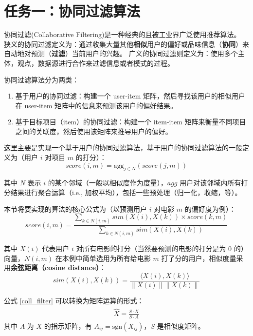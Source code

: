 \documentclass[degree=project,degree-type=project]{thuthesis}
\begin{document}
\chapter{任务一：协同过滤算法}

协同过滤(Collaborative Filtering)是一种经典的且被工业界广泛使用推荐算法。
狭义的协同过滤定义为：通过收集大量其他\textbf{相似}用户的偏好或品味信息（\textbf{协同}）来自动地对预测（\textbf{过滤}）当前用户的兴趣。
广义的协同过滤则定义为：使用多个主体，观点，数据源进行合作来过滤信息或者模式的过程。

协同过滤算法分为两类：

\begin{enumerate}
  \item 基于用户的协同过滤：构建一个 user-item 矩阵，然后寻找该用户的相似用户在 user-item 矩阵中的信息来预测该用户的偏好结果。
  \item 基于目标项目（item）的协同过滤：构建一个 item-item 矩阵来衡量不同项目之间的关联度，然后使用该矩阵来推导用户的偏好。
\end{enumerate}

这里主要是实现一个基于用户的协同过滤算法，基于用户的协同过滤算法的一般定义为（用户 $i$ 对项目 $m$ 的打分）：
\begin{equation}
  score(i, m) = \text{agg}_{j \in N}(score(j, m))
\end{equation}

其中 $N$ 表示 $i$ 的某个邻域（一般以相似度作为度量），$agg$ 用户对该邻域内所有打分结果进行聚合运算（i.e., 加权平均），包括一些预处理（归一化，收缩，等）。

本节将要实现的算法的核心公式为（以预测用户 $i$ 对电影 $m$ 的偏好度为例）：
\begin{equation}
score(i, m) = \frac{\sum_{k \in N(i, m)} sim(X(i), X(k)) \times score(k, m)}{\sum_{k \in N(i, m)} sim(X(i), X(k))}
  \label{coll_filter}
\end{equation}

其中 $X(i)$ 代表用户 $i$ 对所有电影的打分（当然要预测的电影的打分是为 0 的）向量，$N(i, m)$ 在本例中简单选用为所有给电影 $m$ 打了分的用户，相似度量采用\textbf{余弦距离（cosine distance）}：
\begin{equation}
sim(X(i), X(k)) = \frac{\langle X(i), X(k) \rangle}{\lVert X(i) \rVert \lVert X(k) \rVert}
\end{equation}

公式 \ref{coll_filter} 可以转换为矩阵运算的形式：
\begin{align}
  \begin{split}
    \hat{X} = \frac{S \cdot X}{S \cdot A}
  \end{split}
\end{align}
其中 $A$ 为 $X$ 的指示矩阵，有 $A_{ij} = \text{sgn}(X_{ij})$，$S$ 是相似度矩阵。
\end{document}
